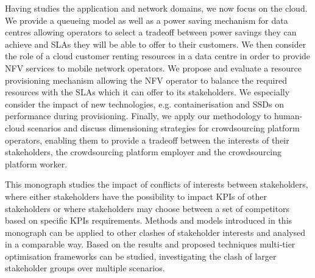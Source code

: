 Having studies the application and network domains, we now focus on the cloud.
We provide a queueing model as well as a power saving mechanism for data centres allowing operators to select a tradeoff between power savings they can achieve and \glspl{SLA} they will be able to offer to their customers.
We then consider the role of a cloud customer renting resources in a data centre in order to provide \gls{NFV} services to mobile network operators.
We propose and evaluate a resource provisioning mechanism allowing the \gls{NFV} operator to balance the required resources with the \glspl{SLA} which it can offer to its stakeholders. 
We especially consider the impact of new technologies, e.g. containerisation and \glspl{SSD} on performance during provisioning.
Finally, we apply our methodology to human-cloud scenarios and discuss dimensioning strategies for crowdsourcing platform operators, enabling them to provide a tradeoff between the interests of their stakeholders, the crowdsourcing platform employer and the crowdsourcing platform worker. 

This monograph studies the impact of conflicts of interests between stakeholders, where either stakeholders have the possibility to impact \glspl{KPI} of other stakeholders or where stakeholders may choose between a set of competitors based on specific \glspl{KPI} requirements.
Methods and models introduced in this monograph can be applied to other clashes of stakeholder interests and analysed in a comparable way.
Based on the results and proposed techniques multi-tier optimisation frameworks can be studied, investigating the clash of larger stakeholder groups over multiple scenarios.